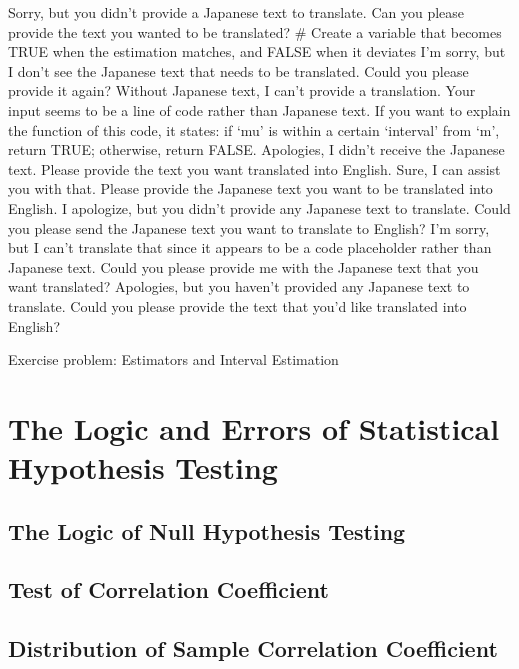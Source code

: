 \documentclass[
  a4paper,
]{book}
\begin{document}
Sorry, but you didn't provide a Japanese text to translate. Can you
please provide the text you wanted to be translated? \# Create a
variable that becomes TRUE when the estimation matches, and FALSE when
it deviates I'm sorry, but I don't see the Japanese text that needs to
be translated. Could you please provide it again? Without Japanese text,
I can't provide a translation. Your input seems to be a line of code
rather than Japanese text. If you want to explain the function of this
code, it states: if `mu' is within a certain `interval' from `m', return
TRUE; otherwise, return FALSE. Apologies, I didn't receive the Japanese
text. Please provide the text you want translated into English. Sure, I
can assist you with that. Please provide the Japanese text you want to
be translated into English. I apologize, but you didn't provide any
Japanese text to translate. Could you please send the Japanese text you
want to translate to English? I'm sorry, but I can't translate that
since it appears to be a code placeholder rather than Japanese text.
Could you please provide me with the Japanese text that you want
translated? Apologies, but you haven't provided any Japanese text to
translate. Could you please provide the text that you'd like translated
into English?

Exercise problem: Estimators and Interval Estimation


\chapter{The Logic and Errors of Statistical Hypothesis
Testing}\label{the-logic-and-errors-of-statistical-hypothesis-testing}

\section{The Logic of Null Hypothesis
Testing}\label{the-logic-of-null-hypothesis-testing}

\section{Test of Correlation
Coefficient}\label{test-of-correlation-coefficient}

\section{Distribution of Sample Correlation
Coefficient}\label{distribution-of-sample-correlation-coefficient}
\end{document}
